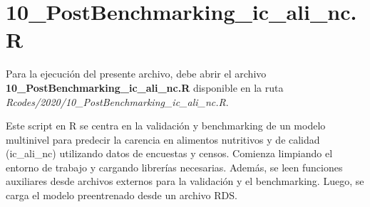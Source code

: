 \documentclass[
  12pt,
]{book}
\newenvironment{Shaded}{\begin{snugshade}}{\end{snugshade}}
\newcommand{\AttributeTok}[1]{\textcolor[rgb]{0.13,0.29,0.53}{#1}}
\newcommand{\DecValTok}[1]{\textcolor[rgb]{0.00,0.00,0.81}{#1}}
\newcommand{\FunctionTok}[1]{\textcolor[rgb]{0.13,0.29,0.53}{\textbf{#1}}}
\newcommand{\NormalTok}[1]{#1}
\newcommand{\OtherTok}[1]{\textcolor[rgb]{0.56,0.35,0.01}{#1}}
\newcommand{\SpecialCharTok}[1]{\textcolor[rgb]{0.81,0.36,0.00}{\textbf{#1}}}
\newcommand{\StringTok}[1]{\textcolor[rgb]{0.31,0.60,0.02}{#1}}
\begin{document}
\begin{Shaded}
\end{Shaded}

\hypertarget{postbenchmarking_ic_ali_nc.r}{%
\chapter*{10\_PostBenchmarking\_ic\_ali\_nc.R}\label{postbenchmarking_ic_ali_nc.r}}

Para la ejecución del presente archivo, debe abrir el archivo \textbf{10\_PostBenchmarking\_ic\_ali\_nc.R} disponible en la ruta \emph{Rcodes/2020/10\_PostBenchmarking\_ic\_ali\_nc.R}.

Este script en R se centra en la validación y benchmarking de un modelo multinivel para predecir la carencia en alimentos nutritivos y de calidad (ic\_ali\_nc) utilizando datos de encuestas y censos. Comienza limpiando el entorno de trabajo y cargando librerías necesarias. Además, se leen funciones auxiliares desde archivos externos para la validación y el benchmarking. Luego, se carga el modelo preentrenado desde un archivo RDS.
\end{document}
